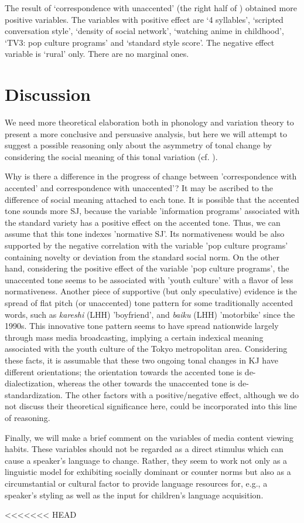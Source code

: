 \documentclass[output=paper]{LSP/langsci}
\begin{document}
The result of  ‘correspondence with unaccented’ (the right half of ) obtained more positive variables. The variables with positive effect are ‘4 syllables’, ‘scripted conversation style’, ‘density of social network’, ‘watching anime in childhood’, ‘TV3: pop culture programs’ and ‘standard style score’. The negative effect variable is ‘rural’ only. There are no marginal ones.

\section{Discussion}
We need more theoretical elaboration both in phonology and variation theory to present a more conclusive and persuasive analysis, but here we will attempt to suggest a possible reasoning only about the asymmetry of tonal change by considering the social meaning of this tonal variation (cf. \citealt{eckert_variation_2008}). 

Why is there a difference in the progress of change between 'correspondence with accented' and correspondence with unaccented'? It may be ascribed to the difference of social meaning attached to each tone. It is possible that the accented tone sounds more SJ, because the variable 'information programs' associated with the standard variety has a positive effect on the accented tone. Thus, we can assume that this tone indexes 'normative SJ'. Its normativeness would be also supported by the negative correlation with the variable 'pop culture programs' containing novelty or deviation from the standard social norm. On the other hand, considering the positive effect of the variable 'pop culture programs', the unaccented tone seems to be associated with 'youth culture' with a flavor of less normativeness. Another piece of supportive (but only speculative) evidence is the spread of flat pitch (or unaccented) tone pattern for some traditionally accented words, such as \textit{kareshi }(LHH) 'boyfriend', and \textit{baiku} (LHH) 'motorbike' since the 1990s. This innovative tone pattern seems to have spread nationwide largely through mass media broadcasting, implying a certain indexical meaning associated with the youth culture of the Tokyo metropolitan area. Considering these facts, it is assumable that these two ongoing tonal changes in KJ have different orientations; the orientation towards the accented tone is de-dialectization, whereas the other towards the unaccented tone is de-standardization. The other factors with a positive/negative effect, although we do not discuss their theoretical significance here, could be incorporated into this line of reasoning.

Finally, we will make a brief comment on the variables of media content viewing habits.  These variables should not be regarded as a direct stimulus which can cause a speaker’s language to change. Rather, they seem to work not only as a linguistic model for exhibiting socially dominant or counter norms but also as a circumstantial or cultural factor to provide language resources for, e.g., a speaker’s styling as well as the input for children’s language acquisition.
     
\printbibliography[heading=subbibliography,notkeyword=this]
<<<<<<< HEAD
\end{document}
